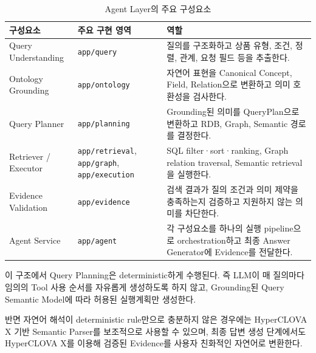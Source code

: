 \documentclass[11pt,a4paper]{article}
\begin{document}
\begin{table}[htbp]
\centering
\caption{Agent Layer의 주요 구성요소}
\small
\begin{tabularx}{\textwidth}{
>{\raggedright\arraybackslash}p{}
>{\raggedright\arraybackslash}p{}
>{\raggedright\arraybackslash}X}
\toprule
\textbf{구성요소} & \textbf{주요 구현 영역} & \textbf{역할} \\
\midrule

Query Understanding &
\texttt{app/query} &
질의를 구조화하고 상품 유형, 조건, 정렬, 관계,
요청 필드 등을 추출한다. \\

\midrule

Ontology Grounding &
\texttt{app/ontology} &
자연어 표현을 Canonical Concept, Field,
Relation으로 변환하고 의미 호환성을 검사한다. \\

\midrule

Query Planner &
\texttt{app/planning} &
Grounding된 의미를 QueryPlan으로 변환하고
RDB, Graph, Semantic 경로를 결정한다. \\

\midrule

Retriever / Executor &
\texttt{app/retrieval},
\texttt{app/graph},
\texttt{app/execution} &
SQL filter·sort·ranking,
Graph relation traversal,
Semantic retrieval을 실행한다. \\

\midrule

Evidence Validation &
\texttt{app/evidence} &
검색 결과가 질의 조건과 의미 제약을 충족하는지 검증하고
지원하지 않는 의미를 차단한다. \\

\midrule

Agent Service &
\texttt{app/agent} &
각 구성요소를 하나의 실행 pipeline으로 orchestration하고
최종 Answer Generator에 Evidence를 전달한다. \\

\bottomrule
\end{tabularx}
\end{table}

이 구조에서 Query Planning은 deterministic하게 수행된다.
즉 LLM이 매 질의마다 임의의 Tool 사용 순서를 자유롭게 생성하도록 하지 않고,
Grounding된 Query Semantic Model에 따라
허용된 실행계획만 생성한다.

반면 자연어 해석이 deterministic rule만으로 충분하지 않은 경우에는
HyperCLOVA X 기반 Semantic Parser를 보조적으로 사용할 수 있으며,
최종 답변 생성 단계에서도 HyperCLOVA X를 이용해
검증된 Evidence를 사용자 친화적인 자연어로 변환한다.
\end{document}
